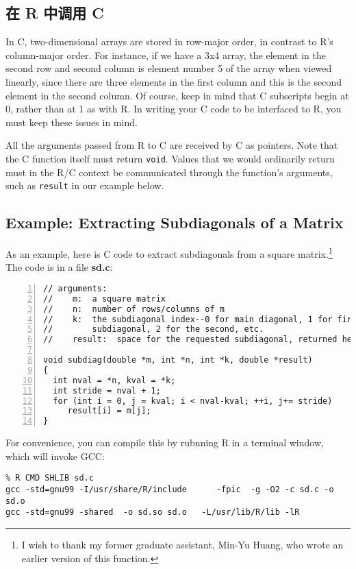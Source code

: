 \subsection{在 R 中调用 C}

In C, two-dimensional arrays are stored in row-major order, in contrast
to R's column-major order.   For instance, if we have a 3x4 array, the
element in the second row and second column is element number 5 of the
array when viewed linearly, since there are three elements in the first
column and this is the second element in the second column.  Of course,
keep in mind that C subscripts begin at 0, rather than at 1 as with R.
In writing your C code to be interfaced to R, you must keep these issues
in mind.

All the arguments passed from R to C are received by C as pointers.
Note that the C function itself must return {\tt void}.  Values that we
would ordinarily return must in the R/C context be communicated through the
function's arguments, such as {\tt result} in our example below.

\subsection{Example:  Extracting Subdiagonals of a Matrix}

As an example, here is C code to extract subdiagonals from a square
matrix.\footnote{I wish to thank my former graduate assistant, Min-Yu
Huang, who wrote an earlier version of this function.} The code is in a
file {\bf sd.c}:

\begin{lstlisting}[numbers=left]
// arguments:
//    m:  a square matrix
//    n:  number of rows/columns of m
//    k:  the subdiagonal index--0 for main diagonal, 1 for first
//        subdiagonal, 2 for the second, etc.
//    result:  space for the requested subdiagonal, returned here

void subdiag(double *m, int *n, int *k, double *result)
{
  int nval = *n, kval = *k;
  int stride = nval + 1;
  for (int i = 0, j = kval; i < nval-kval; ++i, j+= stride)
     result[i] = m[j];
}
\end{lstlisting}

For convenience, you can compile this by rubnning R in a terminal
window, which will invoke GCC:

\begin{lstlisting}
% R CMD SHLIB sd.c
gcc -std=gnu99 -I/usr/share/R/include      -fpic  -g -O2 -c sd.c -o sd.o
gcc -std=gnu99 -shared  -o sd.so sd.o   -L/usr/lib/R/lib -lR
\end{lstlisting}


